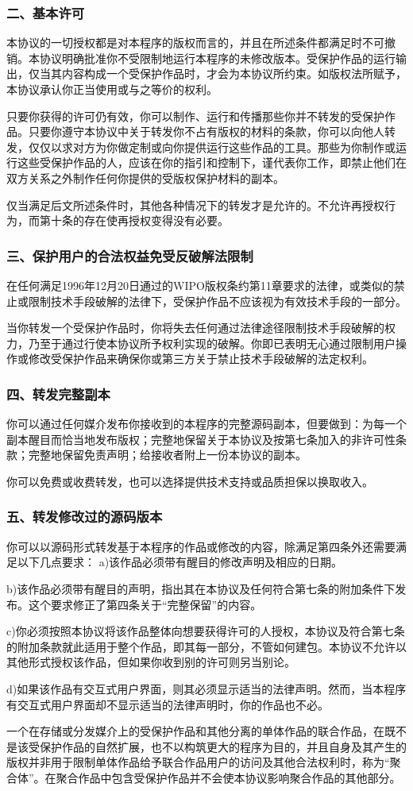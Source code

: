 \subsubsection{二、基本许可}
本协议的一切授权都是对本程序的版权而言的，并且在所述条件都满足时不可撤销。本协议明确批准你不受限制地运行本程序的未修改版本。受保护作品的运行输出，仅当其内容构成一个受保护作品时，才会为本协议所约束。如版权法所赋予，本协议承认你正当使用或与之等价的权利。\par
只要你获得的许可仍有效，你可以制作、运行和传播那些你并不转发的受保护作品。只要你遵守本协议中关于转发你不占有版权的材料的条款，你可以向他人转发，仅仅以求对方为你做定制或向你提供运行这些作品的工具。那些为你制作或运行这些受保护作品的人，应该在你的指引和控制下，谨代表你工作，即禁止他们在双方关系之外制作任何你提供的受版权保护材料的副本。\par
仅当满足后文所述条件时，其他各种情况下的转发才是允许的。不允许再授权行为，而第十条的存在使再授权变得没有必要。
\subsubsection{三、保护用户的合法权益免受反破解法限制}
在任何满足1996年12月20日通过的WIPO版权条约第11章要求的法律，或类似的禁止或限制技术手段破解的法律下，受保护作品不应该视为有效技术手段的一部分。\par
当你转发一个受保护作品时，你将失去任何通过法律途径限制技术手段破解的权力，乃至于通过行使本协议所予权利实现的破解。你即已表明无心通过限制用户操作或修改受保护作品来确保你或第三方关于禁止技术手段破解的法定权利。
\subsubsection{四、转发完整副本}
你可以通过任何媒介发布你接收到的本程序的完整源码副本，但要做到：为每一个副本醒目而恰当地发布版权；完整地保留关于本协议及按第七条加入的非许可性条款；完整地保留免责声明；给接收者附上一份本协议的副本。\par
你可以免费或收费转发，也可以选择提供技术支持或品质担保以换取收入。
\subsubsection{五、转发修改过的源码版本}
你可以以源码形式转发基于本程序的作品或修改的内容，除满足第四条外还需要满足以下几点要求：
a)该作品必须带有醒目的修改声明及相应的日期。\par
b)该作品必须带有醒目的声明，指出其在本协议及任何符合第七条的附加条件下发布。这个要求修正了第四条关于“完整保留”的内容。\par
c)你必须按照本协议将该作品整体向想要获得许可的人授权，本协议及符合第七条的附加条款就此适用于整个作品，即其每一部分，不管如何建包。本协议不允许以其他形式授权该作品，但如果你收到别的许可则另当别论。\par
d)如果该作品有交互式用户界面，则其必须显示适当的法律声明。然而，当本程序有交互式用户界面却不显示适当的法律声明时，你的作品也不必。\par
一个在存储或分发媒介上的受保护作品和其他分离的单体作品的联合作品，在既不是该受保护作品的自然扩展，也不以构筑更大的程序为目的，并且自身及其产生的版权并非用于限制单体作品给予联合作品用户的访问及其他合法权利时，称为“聚合体”。在聚合作品中包含受保护作品并不会使本协议影响聚合作品的其他部分。
